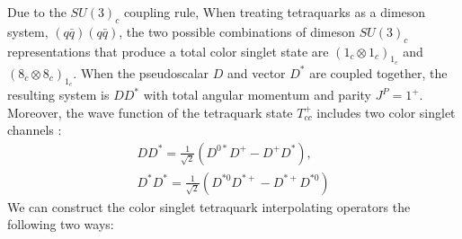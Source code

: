 Due to the $SU(3)_c$ coupling rule, When treating tetraquarks as a dimeson system, $(q\bar{q})(q\bar{q})$, the two possible combinations of dimeson $SU(3)_c$ representations that produce a total color singlet state are $({1_c \otimes 1_c})_{1_c}$ and $({8_c \otimes 8_c})_{1_c}$. When the pseudoscalar $D$ and vector $D^*$ are coupled together, the resulting system is $DD^*$ with total angular momentum and parity $J^P = 1^+$. Moreover, the wave function of the tetraquark state $T_{cc}^+$ includes two color singlet channels :
\begin{align}
    DD^* = \frac{1}{\sqrt{2}}(D^{0*}D^+ - D^+D^*), \\
    D^*D^* = \frac{1}{\sqrt{2}}(D^{*0}D^{*+} - D^{*+}D^{*0})
\end{align} 
We can construct the color singlet tetraquark interpolating operators the following two ways:
